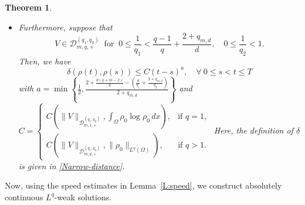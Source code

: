 \documentclass{amsart}
\newtheorem{theorem}[defn]{Theorem}
\numberwithin{equation}{section}
\begin{document}
\begin{theorem}
\begin{itemize}
\item[(iii)] Furthermore, suppose that 
\begin{equation}\label{T:V:divfree_delta}
	V\in \mathcal{D}_{m,q,+}^{(q_1,q_2)}  
	\ \text{ for } \  0 \leq \frac{1}{q_1} < \frac{q-1}{q} + \frac{2+q_{m,d}}{d}, \quad  0 \leq \frac{1}{q_2} < 1.
\end{equation}
Then, we have 
\begin{equation*}\label{T:weakSol:Narrow_2}
\delta(\rho(t),\rho(s))\leq C(t-s)^{a},   \quad  \forall ~ 0\leq s<t\leq T 
\end{equation*}
with $a= \min \left\{ \frac{1}{2}, \frac{2+\frac{d(q+m-2)}{q} - \left(\frac{d}{q_1} + \frac{2+q_{m,d}}{q_2}\right)}{2+q_{m,d}} \right\}$ 
and $C= \begin{cases}
	C ( \|V\|_{\mathcal{D}_{m,1,+}^{(q_1,q_2)}}, \int_{\Omega} \rho_0 \log \rho_0 \,dx ), & \text{if } q=1 , \\
	C (\|V\|_{\mathcal{D}_{m,q,+}^{(q_1,q_2)}}, \|\rho_{0}\|_{L^{q} (\Omega)} ), &\text{if } q>1.
\end{cases}$
Here, the definition of  $\delta$ is given in \eqref{Narrow-distance}.
\end{itemize}
\end{theorem}


Now, using the speed estimates in Lemma~\ref{L:speed}, we construct absolutely continuous \( L^q \)-weak solutions.
\end{document}

